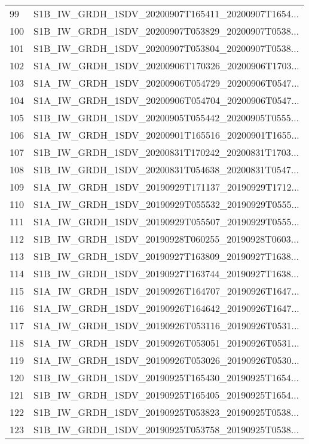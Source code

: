 \begin{tabular}{ll}
99  &  S1B\_IW\_GRDH\_1SDV\_20200907T165411\_20200907T1654... \\
100 &  S1B\_IW\_GRDH\_1SDV\_20200907T053829\_20200907T0538... \\
101 &  S1B\_IW\_GRDH\_1SDV\_20200907T053804\_20200907T0538... \\
102 &  S1A\_IW\_GRDH\_1SDV\_20200906T170326\_20200906T1703... \\
103 &  S1A\_IW\_GRDH\_1SDV\_20200906T054729\_20200906T0547... \\
104 &  S1A\_IW\_GRDH\_1SDV\_20200906T054704\_20200906T0547... \\
105 &  S1B\_IW\_GRDH\_1SDV\_20200905T055442\_20200905T0555... \\
106 &  S1A\_IW\_GRDH\_1SDV\_20200901T165516\_20200901T1655... \\
107 &  S1B\_IW\_GRDH\_1SDV\_20200831T170242\_20200831T1703... \\
108 &  S1B\_IW\_GRDH\_1SDV\_20200831T054638\_20200831T0547... \\
109 &  S1A\_IW\_GRDH\_1SDV\_20190929T171137\_20190929T1712... \\
110 &  S1A\_IW\_GRDH\_1SDV\_20190929T055532\_20190929T0555... \\
111 &  S1A\_IW\_GRDH\_1SDV\_20190929T055507\_20190929T0555... \\
112 &  S1B\_IW\_GRDH\_1SDV\_20190928T060255\_20190928T0603... \\
113 &  S1B\_IW\_GRDH\_1SDV\_20190927T163809\_20190927T1638... \\
114 &  S1B\_IW\_GRDH\_1SDV\_20190927T163744\_20190927T1638... \\
115 &  S1A\_IW\_GRDH\_1SDV\_20190926T164707\_20190926T1647... \\
116 &  S1A\_IW\_GRDH\_1SDV\_20190926T164642\_20190926T1647... \\
117 &  S1A\_IW\_GRDH\_1SDV\_20190926T053116\_20190926T0531... \\
118 &  S1A\_IW\_GRDH\_1SDV\_20190926T053051\_20190926T0531... \\
119 &  S1A\_IW\_GRDH\_1SDV\_20190926T053026\_20190926T0530... \\
120 &  S1B\_IW\_GRDH\_1SDV\_20190925T165430\_20190925T1654... \\
121 &  S1B\_IW\_GRDH\_1SDV\_20190925T165405\_20190925T1654... \\
122 &  S1B\_IW\_GRDH\_1SDV\_20190925T053823\_20190925T0538... \\
123 &  S1B\_IW\_GRDH\_1SDV\_20190925T053758\_20190925T0538... \\

\end{tabular}
